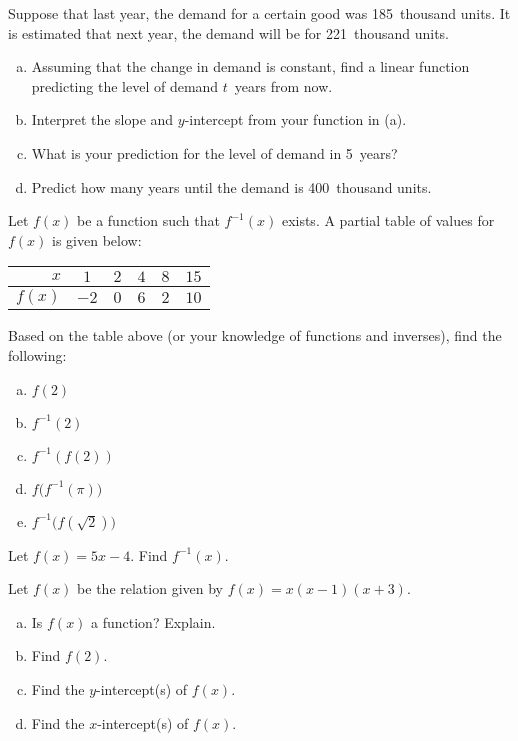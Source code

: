 \documentclass[11pt,letterpaper]{article}
\begin{document}
\prob Suppose that last year, the demand for a certain good was 185~thousand units. It is estimated that next year, the demand will be for 221~thousand units. 
	\begin{enumerate}[(a)]
	\item Assuming that the change in demand is constant, find a linear function predicting the level of demand $t$~years from now.
	\item Interpret the slope and $y$-intercept from your function in (a).
	\item What is your prediction for the level of demand in 5~years?
	\item Predict how many years until the demand is 400~thousand units. 
	\end{enumerate} \pspace


\prob Let $f(x)$ be a function such that $f^{-1}(x)$ exists. A partial table of values for $f(x)$ is given below: \par
	\begin{table}[H]
	\centering
	\begin{tabular}{|r||c|c|c|c|c|} \hline 
	$x$ & $1$ & $2$ & $4$ & $8$ & $15$ \\ \hline
	$f(x)$ & $-2$ & $0$ & $6$ & $2$ & $10$ \\ \hline
	\end{tabular}
	\end{table}
Based on the table above (or your knowledge of functions and inverses), find the following:
	\begin{enumerate}[(a)]
	\item $f(2)$
	\item $f^{-1}(2)$
	\item $f^{-1}(f(2))$
	\item $f \big(f^{-1}(\pi) \big)$
	\item $f^{-1} \big( f(\sqrt{2}) \big)$
	\end{enumerate} \pspace


\prob Let $f(x)= 5x - 4$. Find $f^{-1}(x)$. \pspace


\prob Let $f(x)$ be the relation given by $f(x)= x(x - 1)(x + 3)$. 
	\begin{enumerate}[(a)]
	\item Is $f(x)$ a function? Explain. 
	\item Find $f(2)$.
	\item Find the $y$-intercept(s) of $f(x)$. 
	\item Find the $x$-intercept(s) of $f(x)$.
	\end{enumerate} \pspace
\end{document}

